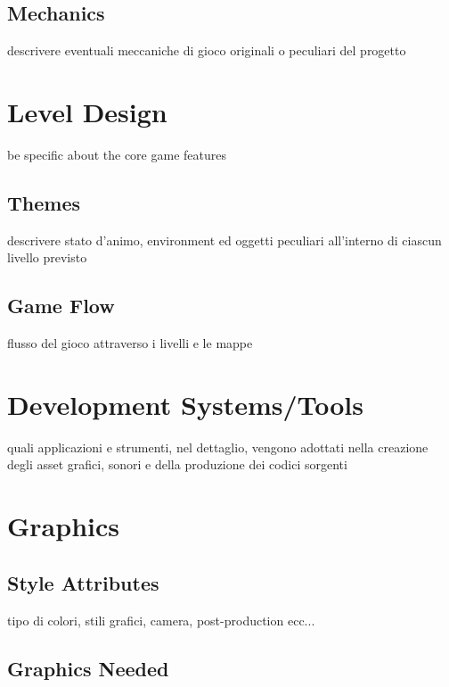 \documentclass[a4paper]{scrreprt}
\begin{document}
\section{Mechanics}
descrivere eventuali meccaniche di gioco originali o peculiari del progetto


\chapter{Level Design}
be specific about the core game features 

\section{Themes}
descrivere stato d'animo, environment ed oggetti peculiari all'interno di ciascun livello previsto

\section{Game Flow}
flusso del gioco attraverso i livelli e le mappe


\chapter{Development Systems/Tools}
quali applicazioni e strumenti, nel dettaglio, vengono adottati nella creazione degli asset grafici, sonori e della produzione dei codici sorgenti


\chapter{Graphics}

\section{Style Attributes}
tipo di colori, stili grafici, camera, post-production ecc...

\section{Graphics Needed}
\end{document}
